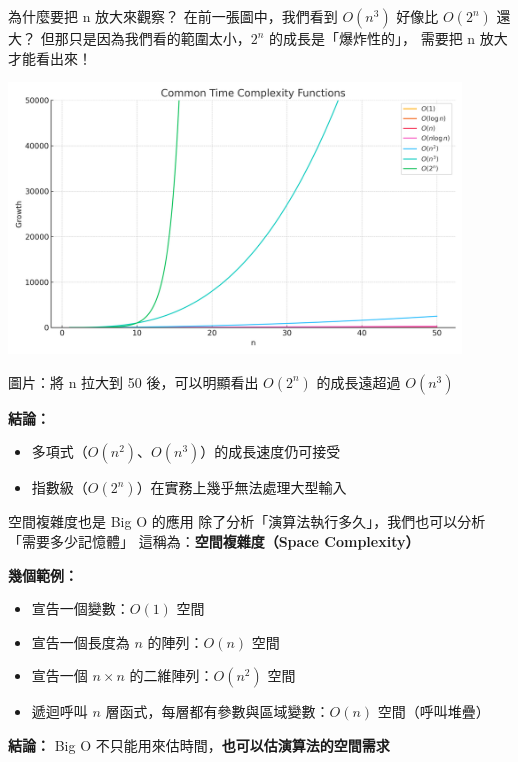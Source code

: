 \documentclass{beamer}
\begin{document}
\begin{frame}{為什麼要把 n 放大來觀察？}
在前一張圖中，我們看到 $O(n^3)$ 好像比 $O(2^n)$ 還大？  
但那只是因為我們看的範圍太小，$2^n$ 的成長是「爆炸性的」，  
需要把 n 放大才能看出來！

\vspace{1em}
\begin{center}
    \includegraphics[width=0.9\textwidth]{images/time_complexity_curves_large_n.png}
    
    {\tiny 圖片：將 n 拉大到 50 後，可以明顯看出 $O(2^n)$ 的成長遠超過 $O(n^3)$}
\end{center}

\vspace{1em}
\textbf{結論：}
\begin{itemize}
    \item 多項式（$O(n^2)$、$O(n^3)$）的成長速度仍可接受
    \item 指數級（$O(2^n)$）在實務上幾乎無法處理大型輸入
\end{itemize}
\end{frame}

\begin{frame}{空間複雜度也是 Big O 的應用}
除了分析「演算法執行多久」，我們也可以分析「需要多少記憶體」  
這稱為：\textbf{空間複雜度（Space Complexity）}

\vspace{1em}
\textbf{幾個範例：}

\begin{itemize}
    \item 宣告一個變數：\quad $O(1)$ 空間
    \item 宣告一個長度為 $n$ 的陣列：\quad $O(n)$ 空間
    \item 宣告一個 $n \times n$ 的二維陣列：\quad $O(n^2)$ 空間
    \item 遞迴呼叫 $n$ 層函式，每層都有參數與區域變數：\quad $O(n)$ 空間（呼叫堆疊）
\end{itemize}

\vspace{1em}
\textbf{結論：}  
Big O 不只能用來估時間，\textbf{也可以估演算法的空間需求}
\end{frame}
\end{document}
